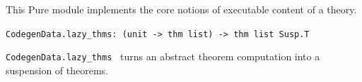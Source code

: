 \begin{isabellebody}
\begin{isamarkuptext}
\begin{description}
  \end{description}%
\end{isamarkuptext}%
\isamarkuptrue%
%
\endisatagmlref
{\isafoldmlref}%
%
\isadelimmlref
%
\endisadelimmlref
%
\isamarkuptrue%
%
\begin{isamarkuptext}%
This Pure module implements the core notions of
  executable content of a theory.%
\end{isamarkuptext}%
\isamarkuptrue%
%
\isamarkuptrue%
%
\isadelimmlref
%
\endisadelimmlref
%
\isatagmlref
%
\begin{isamarkuptext}%
\begin{mldecls}
  \verb|CodegenData.lazy_thms: (unit -> thm list) -> thm list Susp.T|
  \end{mldecls}

  \begin{description}

  \item \verb|CodegenData.lazy_thms|~ turns an abstract
     theorem computation  into a suspension of theorems.


\end{description}
\end{isamarkuptext}
\end{isabellebody}

